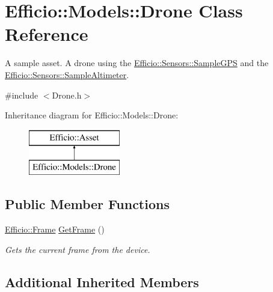 \hypertarget{class_efficio_1_1_models_1_1_drone}{}\section{Efficio\+:\+:Models\+:\+:Drone Class Reference}
\label{class_efficio_1_1_models_1_1_drone}


A sample asset. A drone using the \hyperlink{class_efficio_1_1_sensors_1_1_sample_g_p_s}{Efficio\+::\+Sensors\+::\+Sample\+G\+PS} and the \hyperlink{class_efficio_1_1_sensors_1_1_sample_altimeter}{Efficio\+::\+Sensors\+::\+Sample\+Altimeter}.  




{\ttfamily \#include $<$Drone.\+h$>$}

Inheritance diagram for Efficio\+:\+:Models\+:\+:Drone\+:\begin{figure}[H]
\begin{center}
\leavevmode
\includegraphics[height=2.000000cm]{class_efficio_1_1_models_1_1_drone}
\end{center}
\end{figure}
\subsection*{Public Member Functions}
\begin{DoxyCompactItemize}
\item 
\hyperlink{class_efficio_1_1_frame}{Efficio\+::\+Frame} \hyperlink{class_efficio_1_1_models_1_1_drone_ae03e2fe96284828ae6a396e17b1e8c92}{Get\+Frame} ()\hypertarget{class_efficio_1_1_models_1_1_drone_ae03e2fe96284828ae6a396e17b1e8c92}{}\label{class_efficio_1_1_models_1_1_drone_ae03e2fe96284828ae6a396e17b1e8c92}

\begin{DoxyCompactList}\small\item\em Gets the current frame from the device. \end{DoxyCompactList}\end{DoxyCompactItemize}
\subsection*{Additional Inherited Members}


